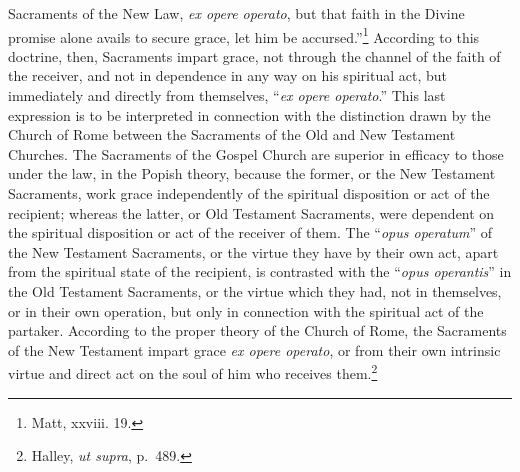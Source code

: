 \documentclass[]{book}
\begin{document}
Sacraments of the New Law, \emph{ex opere operato}, but that faith in the Divine promise alone avails to secure grace, let him be accursed.''\footnote{Matt, xxviii. 19.} According to this doctrine, then, Sacraments impart grace, not through the channel of the faith of the receiver, and not in dependence in any way on his spiritual act, but immediately and directly from themselves, ``\emph{ex opere operato}.'' This last expression is to be interpreted in connection with the distinction drawn by the Church of Rome between the Sacraments of the Old and New Testament Churches. The Sacraments of the Gospel Church are superior in efficacy to those under the law, in the Popish theory, because the former, or the New Testament Sacraments, work grace independently of the spiritual disposition or act of the recipient; whereas the latter, or Old Testament Sacraments, were dependent on the spiritual disposition or act of the receiver of them. The ``\emph{opus operatum}'' of the New Testament Sacraments, or the virtue they have by their own act, apart from the spiritual state of the recipient, is contrasted with the ``\emph{opus operantis}'' in the Old Testament Sacraments, or the virtue which they had, not in themselves, or in their own operation, but only in connection with the spiritual act of the partaker. According to the proper theory of the Church of Rome, the Sacraments of the New Testament impart grace \emph{ex opere operato}, or from their own intrinsic virtue and direct act on the soul of him who receives them.\footnote{Halley, \emph{ut supra}, p.~489.}
\end{document}
